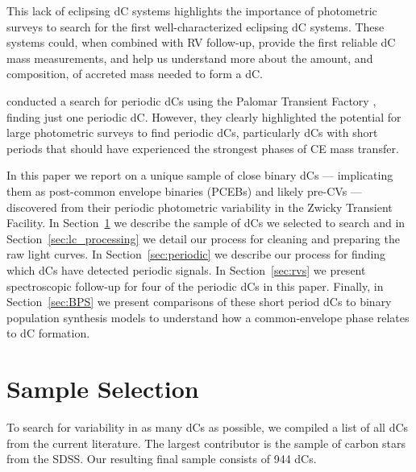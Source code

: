 \documentclass[twocolumn]{aastex631}
\begin{document}
This lack of eclipsing dC systems highlights the importance of photometric surveys to search for the first well-characterized eclipsing dC systems. These systems could, when combined with RV follow-up, provide the first reliable dC mass measurements, and help us understand more about the amount, and composition, of accreted mass needed to form a dC. 

\citet{Margon2018} conducted a search for periodic dCs using the Palomar Transient Factory \citep[PTF;][]{Law2009, Rau2009}, finding just one periodic dC. However, they clearly highlighted the potential for large photometric surveys to find periodic dCs, particularly dCs with short periods that should have experienced the strongest phases of CE mass transfer. 

 In this paper we report on a unique sample of close binary dCs --- implicating them as post-common envelope binaries (PCEBs) and likely pre-CVs --- discovered from their periodic photometric variability in the Zwicky Transient Facility. In Section~\ref{sec:sample} we describe the sample of dCs we selected to search and in Section~\ref{sec:lc_processing} we detail our process for cleaning and preparing the raw light curves. In Section~\ref{sec:periodic} we describe our process for finding which dCs have detected periodic signals. In Section~\ref{sec:rvs} we present spectroscopic follow-up for four of the periodic dCs in this paper. Finally, in Section~\ref{sec:BPS} we present comparisons of these short period dCs to binary population synthesis models to understand how a common-envelope phase relates to dC formation.
\section{Sample Selection}\label{sec:sample}

To search for variability in as many dCs as possible, we compiled a list of all dCs from the current literature. The largest contributor  is the \citet{Green2013} sample of carbon stars from the SDSS.  Our resulting final sample consists of 944 dCs.
\end{document}
